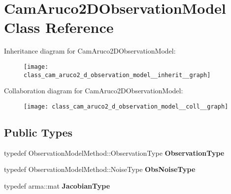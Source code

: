 \hypertarget{class_cam_aruco2_d_observation_model}{\section{\-Cam\-Aruco2\-D\-Observation\-Model \-Class \-Reference}
\label{class_cam_aruco2_d_observation_model}
}


\-Inheritance diagram for \-Cam\-Aruco2\-D\-Observation\-Model\-:
\nopagebreak
\begin{figure}[H]
\begin{center}
\leavevmode
\texttt{[image: class\_cam\_aruco2\_d\_observation\_model\_\_inherit\_\_graph]}
\end{center}
\end{figure}


\-Collaboration diagram for \-Cam\-Aruco2\-D\-Observation\-Model\-:
\nopagebreak
\begin{figure}[H]
\begin{center}
\leavevmode
\texttt{[image: class\_cam\_aruco2\_d\_observation\_model\_\_coll\_\_graph]}
\end{center}
\end{figure}
\subsection*{\-Public \-Types}
\begin{DoxyCompactItemize}
\item 
\hypertarget{class_cam_aruco2_d_observation_model_a227cf56e4ad62f5fec7c88b5b8c5a403}{typedef \*
\-Observation\-Model\-Method\-::\-Observation\-Type {\bfseries \-Observation\-Type}}\label{class_cam_aruco2_d_observation_model_a227cf56e4ad62f5fec7c88b5b8c5a403}

\item 
\hypertarget{class_cam_aruco2_d_observation_model_a45378bb9e9708b75b6d7cea400c4e179}{typedef \*
\-Observation\-Model\-Method\-::\-Noise\-Type {\bfseries \-Obs\-Noise\-Type}}\label{class_cam_aruco2_d_observation_model_a45378bb9e9708b75b6d7cea400c4e179}

\item 
\hypertarget{class_cam_aruco2_d_observation_model_aabb4595d4a78f07033daee230dd3b7e8}{typedef arma\-::mat {\bfseries \-Jacobian\-Type}}\label{class_cam_aruco2_d_observation_model_aabb4595d4a78f07033daee230dd3b7e8}

\end{DoxyCompactItemize}
